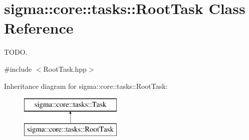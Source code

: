 \hypertarget{classsigma_1_1core_1_1tasks_1_1_root_task}{\section{sigma\-:\-:core\-:\-:tasks\-:\-:Root\-Task Class Reference}
\label{classsigma_1_1core_1_1tasks_1_1_root_task}
}


T\-O\-D\-O.  




{\ttfamily \#include $<$Root\-Task.\-hpp$>$}

Inheritance diagram for sigma\-:\-:core\-:\-:tasks\-:\-:Root\-Task\-:\begin{figure}[H]
\begin{center}
\leavevmode
\includegraphics[height=2.000000cm]{classsigma_1_1core_1_1tasks_1_1_root_task}
\end{center}
\end{figure}
